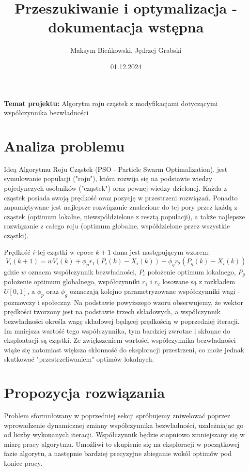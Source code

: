 \documentclass[12pt]{article}
\title{Przeszukiwanie i optymalizacja - dokumentacja wstępna}
\author{Maksym Bieńkowski, Jędrzej Grabski}
\date{01.12.2024}
\begin{document}
\maketitle
\begin{centering}
	\textbf{Temat projektu: }Algorytm roju cząstek z modyfikacjami dotyczącymi współczynnika bezwładności
\end{centering}

\section{Analiza problemu}

Ideą Algorytmu Roju Cząstek (PSO - Particle Swarm Optimalization), jest symulowanie populacji ("roju"),
która rozwija się na podstawie wiedzy pojedynczych osobników ("cząstek") oraz pewnej wiedzy dzielonej.
Każda z cząstek posiada swoją prędkość oraz pozycję w przestrzeni rozwiązań.
Ponadto zapamiętywane jest najlepsze rozwiązanie znalezione do tej pory przez każdą z cząstek (optimum lokalne, niewspółdzielone
z resztą populacji), a także najlepsze rozwiązanie z całego roju (optimum globalne, współdzielone przez wszystkie cząstki).

Prędkość \(i\)-tej cząstki w epoce \(k+1\) dana jest następującym wzorem:\[V_i(k+1) = wV_i(k) + \phi_p r_1(P_i(k) - X_i(k)) + \phi_g r_2(P_g(k) - X_i(k))\]
gdzie \(w\) oznacza współczynnik bezwładności, \(P_i\) położenie optimum lokalnego, \(P_g\) położenie optimum globalnego, współczynniki \(r_1\) i \(r_2\)
losowane są z rozkładem \(U[0, 1]\), a \(\phi_p\) oraz \(\phi_g\) oznaczają kolejno parametryzowane współczynniki wagi - poznawczy i społeczny. Na podstawie powyższego wzoru obserwujemy,
że wektor prędkości tworzony jest na podstawie trzech składowych, a współczynnik bezwładności określa wagę składowej będącej
prędkością w poprzedniej iteracji. Im mniejsza wartość tego współczynnika, tym bardziej zwrotne i skłonne do eksploatacji są cząstki.
Ze zwiększeniem wartości współczynnika bezwładności wiąże się natomiast większa skłonność do eksploracji przestrzeni, co może jednak skutkować "przestrzeliwaniem"\space
optimów lokalnych.



\section{Propozycja rozwiązania}

Problem sformułowany w poprzedniej sekcji spróbujemy zniwelować poprzez wprowadzenie dynamicznej zmiany współczynnika bezwładności,
uzależniając go od liczby wykonanych iteracji. Współczynnik będzie stopniowo zmniejszany się w miarę pracy algorytmu.
Umożliwi to skupienie się na eksploracji w początkowej fazie algorytu, a następnie bardziej precyzyjne
zbieganie wokół optimów pod koniec pracy.
\end{document}
